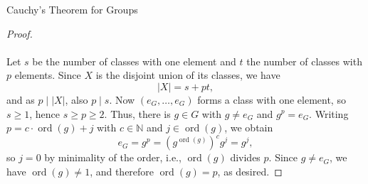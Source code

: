 \begin{appendixitem}{Cauchy's Theorem for Groups}
\begin{proof}
        \\\\
        Let \( s \) be the number of classes with one element and \( t \) the number of classes with \( p \) elements. Since \( X \) is the disjoint union of its classes, we have
        \[
            \left| X \right| = s + pt,
        \]
        and as \( p \mid \left| X \right| \), also \( p \mid s \). Now \( \left(e_{G}, \dots, e_{G}\right) \) forms a class with one element, so \( s \geq 1 \), hence \( s \geq p \geq 2 \). Thus, there is \( g \in G \) with \( g \neq e_{G} \) and \( g^{p} = e_{G} \). Writing \( p = c \cdot \operatorname{ord}\left(g\right) + j \) with \( c \in \mathbb{N} \) and \( j \in \operatorname{ord}\left(g\right) \), we obtain
        \[
            e_{G} = g^{p} = \left(g^{\operatorname{ord}\left(g\right)}\right)^{c} g^{j} = g^{j},
        \]
        so \( j = 0 \) by minimality of the order, i.e., \( \operatorname{ord}\left(g\right) \) divides \( p \). Since \( g \neq e_{G} \), we have \( \operatorname{ord}\left(g\right) \neq 1 \), and therefore \( \operatorname{ord}\left(g\right) = p \), as desired.
    \end{proof}
\end{appendixitem}
